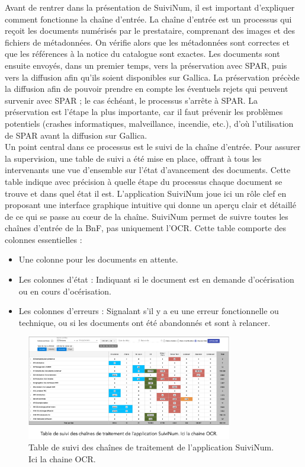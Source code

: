 \documentclass[a4paper,12pt,twoside]{book}
\begin{document}
	Avant de rentrer dans la présentation de SuiviNum, il est important d’expliquer comment fonctionne la chaîne d’entrée. 
	La chaîne d'entrée est un processus qui reçoit les documents numérisés par le prestataire, comprenant des images et des fichiers de métadonnées. On vérifie alors que les métadonnées sont correctes et que les références à la notice du catalogue sont exactes. Les documents sont ensuite envoyés, dans un premier temps, vers la préservation avec SPAR, puis vers la diffusion afin qu'ils soient disponibles sur Gallica. La préservation précède la diffusion afin de pouvoir prendre en compte les éventuels rejets qui peuvent survenir avec SPAR ; le cas échéant, le processus s'arrête à SPAR. La préservation est l'étape la plus importante, car il faut prévenir les problèmes potentiels (crashes informatiques, malveillance, incendie, etc.), d'où l'utilisation de SPAR avant la diffusion sur Gallica.
	\\
	
	Un point central dans ce processus est le suivi de la chaîne d'entrée. Pour assurer la supervision, une table de suivi a été mise en place, offrant à tous les intervenants une vue d'ensemble sur l'état d'avancement des documents. Cette table indique avec précision à quelle étape du processus chaque document se trouve et dans quel état il est. L'application SuiviNum joue ici un rôle clef en proposant une interface graphique intuitive qui donne un aperçu clair et détaillé de ce qui se passe au cœur de la chaîne. SuiviNum permet de suivre toutes les chaînes d'entrée de la BnF, pas uniquement l'OCR. Cette table comporte des colonnes essentielles :
	\begin{itemize}
		\item Une colonne pour les documents en attente.
		\item Les colonnes d'état : Indiquant si le document est en demande d'océrisation ou en cours d’océrisation.
		\item Les colonnes d'erreurs : Signalant s'il y a eu une erreur fonctionnelle ou technique, ou si les documents ont été abandonnés et sont à relancer.
	\end{itemize}
	
	\begin{figure}[h!]
		\centering
		\includegraphics[width=0.8\textwidth]{images/suivi_num.png}
		\caption{Table de suivi des chaînes de traitement de l’application SuiviNum. Ici la chaine OCR. }
		\label{fig:monimage}
	\end{figure}
	
\end{document}
